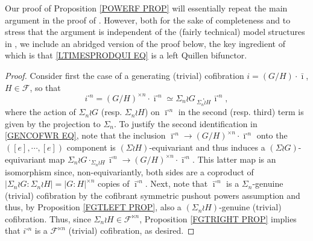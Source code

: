\documentclass[a4paper,10pt
,draft
]{article}%
\numberwithin{equation}{section}
\numberwithin{figure}{section}
\theoremstyle{definition} %
\newcommand{\1}{\ensuremath{\mathbbm 1}}%
\begin{document}
Our proof of Proposition \ref{POWERF PROP} will essentially repeat the main argument in the proof of
\cite[Thm. 1.2]{Pe16}.
However, both for the sake of completeness and to stress that the argument is independent of the (fairly technical) model structures in \cite{Pe16}, we include an abridged version of the proof below, the key ingredient 
of which is that \eqref{LTIMESPRODQUI EQ} is a left Quillen bifunctor. 


\begin{proof}
	Consider first the case of a generating
	(trivial) cofibration
	$i = (G/H) \cdot \bar{\imath}$, $H\in \mathcal{F}$, so that 
\begin{equation}\label{GENCOFWR EQ}
	i^{\square n} = 
	(G/H)^{\times n} \cdot \bar{\imath}^{\square n}
	\simeq \Sigma_n \wr G 
	\underset{\Sigma_n \wr H}{\cdot} \bar{\imath}^{\square n},
\end{equation}
	where the action of 
	$\Sigma_n \wr G$
	(resp. $\Sigma_n \wr H$)
	on $\bar{\imath}^{\square n}$
	in the second (resp. third) term
	is given by the projection to $\Sigma_n$.
%
	To justify the second identification 
	in \eqref{GENCOFWR EQ},
	note that the inclusion 
	$\bar{\imath}^{\square n}
	\to 
	(G/H)^{\times n} \cdot \bar{\imath}^{\square n}$
	onto the 
	$([e],\cdots,[e])$
	component
	is $(\Sigma \wr H)$-equivariant
	and thus induces
	a $(\Sigma \wr G)$-equivariant map 
	$\Sigma_n \wr G 
	\cdot_{\Sigma_n \wr H}
	\bar{\imath}^{\square n}
	\to 
	(G/H)^{\times n} \cdot \bar{\imath}^{\square n}$.
	This latter map is an isomorphism since,
	non-equivariantly,
	both sides are a coproduct of
	$|\Sigma_n \wr G : \Sigma_n \wr H|
	= |G \colon H|^{\times n}$
	copies of $\bar{\imath}^{\square n}$.
%	
	Next, note that 
	$\bar{\imath}^{\square n}$
	is a $\Sigma_n$-genuine (trivial) cofibration
	by the cofibrant symmetric pushout powers assumption
	and thus, by Proposition \ref{FGTLEFT PROP},
	also a 
	$(\Sigma_n \wr H)$-genuine (trivial) cofibration. 
	Thus, since 
	$\Sigma_n \wr H \in \mathcal{F}^{\ltimes n}$,
	Proposition \ref{FGTRIGHT PROP} implies that
	$i^{\square n}$ is a $\mathcal{F}^{\ltimes n}$ 
	(trivial) cofibration, as desired.


\end{proof}
\end{document}
